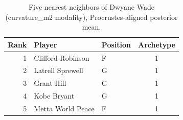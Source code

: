 \begin{table}[htbp]
  \centering\small
  \begin{tabular}{rllc}
    \toprule
    Rank & Player & Position & Archetype \\
    \midrule
    1 & Clifford Robinson & F & 1 \\
    2 & Latrell Sprewell & G & 1 \\
    3 & Grant Hill & G & 1 \\
    4 & Kobe Bryant & G & 1 \\
    5 & Metta World Peace & F & 1 \\
    \bottomrule
  \end{tabular}
  \caption{Five nearest neighbors of Dwyane Wade (curvature_m2 modality), Procrustes-aligned posterior mean.}
  \label{tab:Dwyane_Wade_neighbors_curvature_m2}
\end{table}

